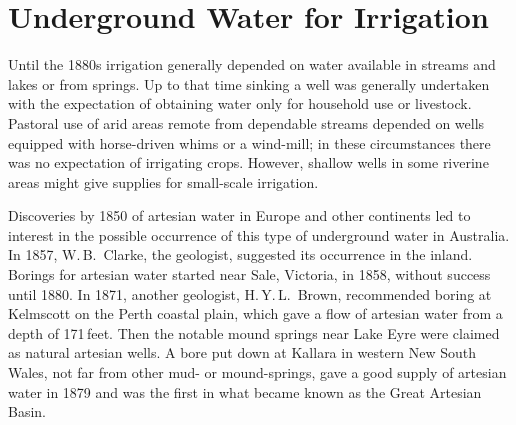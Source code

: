 
\chapter{Underground Water for Irrigation}

\label{ch:underground}

\setcounter{endnote}{0}

Until the 1880s irrigation generally depended on water available in
streams and lakes or from springs.  Up to that time sinking a well was
generally undertaken with the expectation of obtaining water only for
household use or livestock.  Pastoral use of arid areas remote from
dependable streams depended on wells equipped with
horse-driven whims or a
wind-mill; in these circumstances there
was no expectation of irrigating crops.  However, shallow wells in
some riverine areas might give supplies for small-scale irrigation.

Discoveries by 1850 of artesian water  in
Europe and other continents led to interest in the
possible occurrence of this type of underground water in Australia.
In 1857, W.\,B.~Clarke,   the geologist,
suggested its occurrence in the inland. Borings for artesian water
started near Sale,  Victoria, in 1858, without
success until 1880.  In 1871, another geologist, H.\,Y.\,L.~Brown,
 recommended boring at Kelmscott
 on the Perth coastal plain, which gave a flow of
artesian water from a depth of 171\,feet.  Then the notable mound
springs  near Lake Eyre  were
claimed as natural artesian wells. A bore put
down at Kallara  in western New South Wales, not
far from other mud- or mound-springs, gave a good supply of artesian
water in 1879 and was the first in what became known as the Great
Artesian 
Basin.


